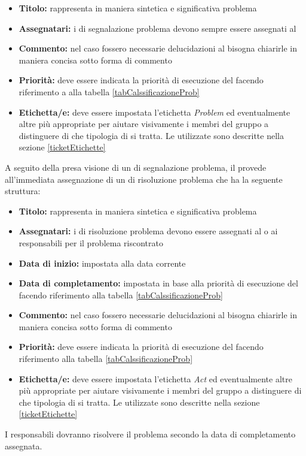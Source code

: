 \documentclass[12pt,a4paper]{article}
\begin{document}
\begin{itemize}
	\item \textbf{Titolo:} rappresenta in maniera sintetica e significativa problema
	\item \textbf{Assegnatari:} i  di segnalazione problema devono sempre essere assegnati al \RE
	\item \textbf{Commento:} nel caso fossero necessarie delucidazioni al  bisogna chiarirle in maniera concisa sotto forma di commento
	\item \textbf{Priorità:} deve essere indicata la priorità di esecuzione del  facendo riferimento a alla tabella \ref{tabCalssificazioneProb}
	\item \textbf{Etichetta/e:} deve essere impostata l'etichetta \textit{Problem} ed eventualmente altre  più appropriate  per aiutare visivamente i membri del gruppo a distinguere di che tipologia di  si tratta. Le  utilizzate sono descritte nella sezione \ref{ticketEtichette}
\end{itemize}


A seguito della presa visione di un  di segnalazione problema, il \RE{} provede all'immediata assegnazione di un  di risoluzione problema che ha la seguente struttura:
\begin{itemize}
	\item \textbf{Titolo:} rappresenta in maniera sintetica e significativa problema
	\item \textbf{Assegnatari:} i  di risoluzione problema devono essere assegnati al o ai responsabili per il problema riscontrato
	\item \textbf{Data di inizio:} impostata alla data corrente
	\item \textbf{Data di completamento:} impostata in base alla priorità di esecuzione del  facendo riferimento alla tabella \ref{tabCalssificazioneProb}
	\item \textbf{Commento:} nel caso fossero necessarie delucidazioni al  bisogna chiarirle in maniera concisa sotto forma di commento
	\item \textbf{Priorità:} deve essere indicata la priorità di esecuzione del  facendo riferimento alla tabella \ref{tabCalssificazioneProb}
	\item \textbf{Etichetta/e:} deve essere impostata l'etichetta \textit{Act} ed eventualmente altre  più appropriate  per aiutare visivamente i membri del gruppo a distinguere di che tipologia di  si tratta. Le  utilizzate sono descritte nella sezione \ref{ticketEtichette}
\end{itemize}
I responsabili dovranno risolvere il problema secondo la data di completamento assegnata.
\end{document}
